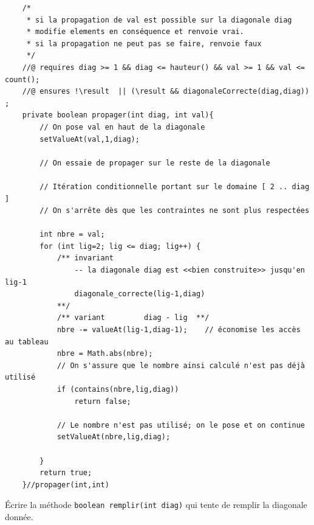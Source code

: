 \documentclass[10pt]{article}\usepackage[correction,nu]{esial}
\begin{document}
\begin{Reponse}
\begin{verbatim}
    /*
     * si la propagation de val est possible sur la diagonale diag
     * modifie elements en conséquence et renvoie vrai.
     * si la propagation ne peut pas se faire, renvoie faux
     */ 
    //@ requires diag >= 1 && diag <= hauteur() && val >= 1 && val <= count();
    //@ ensures !\result  || (\result && diagonaleCorrecte(diag,diag)) ;
    private boolean propager(int diag, int val){
        // On pose val en haut de la diagonale
        setValueAt(val,1,diag);

        // On essaie de propager sur le reste de la diagonale

        // Itération conditionnelle portant sur le domaine [ 2 .. diag ]
        // On s'arrête dès que les contraintes ne sont plus respectées

        int nbre = val;
        for (int lig=2; lig <= diag; lig++) {
            /** invariant
                -- la diagonale diag est <<bien construite>> jusqu'en lig-1
                diagonale_correcte(lig-1,diag)
            **/
            /** variant         diag - lig  **/
            nbre -= valueAt(lig-1,diag-1);    // économise les accès au tableau
            nbre = Math.abs(nbre);
            // On s'assure que le nombre ainsi calculé n'est pas déjà utilisé
            if (contains(nbre,lig,diag))
                return false;

            // Le nombre n'est pas utilisé; on le pose et on continue
            setValueAt(nbre,lig,diag);

        }
        return true;
    }//propager(int,int)
\end{verbatim}
\end{Reponse}
\begin{Question}
  Écrire la méthode \texttt{boolean remplir(int diag)} qui tente de remplir la
  diagonale donnée.
\end{Question}
\end{document}
